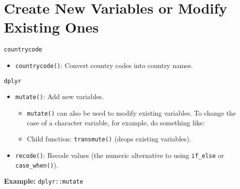 \documentclass[
]{book}
\newenvironment{Shaded}{\begin{snugshade}}{\end{snugshade}}
\newcommand{\CommentTok}[1]{\textcolor[rgb]{0.56,0.35,0.01}{\textit{#1}}}
\newcommand{\DataTypeTok}[1]{\textcolor[rgb]{0.13,0.29,0.53}{#1}}
\newcommand{\DecValTok}[1]{\textcolor[rgb]{0.00,0.00,0.81}{#1}}
\newcommand{\KeywordTok}[1]{\textcolor[rgb]{0.13,0.29,0.53}{\textbf{#1}}}
\newcommand{\NormalTok}[1]{#1}
\newcommand{\OperatorTok}[1]{\textcolor[rgb]{0.81,0.36,0.00}{\textbf{#1}}}
\newcommand{\StringTok}[1]{\textcolor[rgb]{0.31,0.60,0.02}{#1}}
\providecommand{\tightlist}{%
  \setlength{\itemsep}{0pt}\setlength{\parskip}{0pt}}
\begin{document}
\hypertarget{create-new-variables-or-modify-existing-ones}{%
\section{Create New Variables or Modify Existing Ones}\label{create-new-variables-or-modify-existing-ones}}

\texttt{countrycode}

\begin{itemize}
\tightlist
\item
  \texttt{countrycode()}: Convert country codes into country names.
\end{itemize}

\texttt{dplyr}

\begin{itemize}
\tightlist
\item
  \texttt{mutate()}: Add new variables.

  \begin{itemize}
  \tightlist
  \item
    \texttt{mutate()} can also be used to modify existing variables. To change the case of a character variable, for example, do something like:
  \item
    Child function: \texttt{transmute()} (drops existing variables).
  \end{itemize}
\item
  \texttt{recode()}: Recode values (the numeric alternative to using \texttt{if\_else} or \texttt{case\_when()}).
\end{itemize}

\textbf{Example:} \texttt{dplyr::mutate}

\begin{Shaded}
\end{Shaded}
\end{document}
